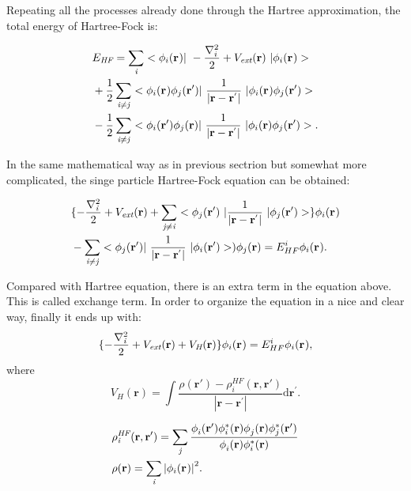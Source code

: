 \documentclass[a4paper, 12pt, titlepage,oneside,drop]{kthesis}
\begin{document}
Repeating all the processes already done through the Hartree approximation, the total energy of Hartree-Fock is:

\begin{equation}\begin{split}
&E_\textit{HF} = \sumi<i> <\bwf<i><> |\ -\frac{\nabla^{2}_{i}}{2} + V_\textit{ext}(\textbf{r})  \ | \bwf<i><> > \\
& + \frac{1}{2} \suminj<i><j> <\bwf<i><> \bwfn<j><'>|\ \frac{1}{|\textbf{r} - \textbf{r}^{'} |} \ | \bwf<i><> \bwfn<j><'>> \\
& - \frac{1}{2} \suminj<i><j> <\bwfn<i><'> \bwfn<j><>|\ \frac{1}{|\textbf{r} - \textbf{r}^{'} |} \ | \bwfn<i><> \bwfn<j><'>>.
\end{split}\end{equation}

In the same mathematical way as in previous sectrion but somewhat more complicated, the singe particle Hartree-Fock equation can be obtained:

\begin{equation}\begin{split}
& \{ -\frac{\nabla^{2}_{\textit i}}{2} + V_\textit{ext}(\textbf{r})+ \suminj<j><i> <\bwfn<j><'>\ | \frac{1}{|\textbf{r} - \textbf{r}^{'} |} \ | \bwfn<j><'>> \} \bwf<i><>  \\
& - \suminj<i><j>  < \bwfn<j><'>|\ \frac{1}{|\textbf{r} - \textbf{r}^{'} |} \ | \bwfn<i><'> >) \bwfn<j><>  = E^{i}_{HF} \bwf<i><>.
\end{split}\end{equation}

Compared with Hartree equation, there is an extra term in the equation above. This is called exchange term. In order to organize the equation in a nice and clear way, finally it ends up with:
\begin{equation}\label{aaaaa}\begin{split}
\{ -\frac{\nabla^{2}_{\textit i}}{2} + V_\textit{ext}(\textbf{r}) +V_\textit{H}(\textbf{r}) \}  \bwf<i><>  = E^{i}_{HF}   \bwf<i><>, 
\end{split}\end{equation}
where
\begin{equation}
 V_\textit{H}(\textbf{r})= \int \frac{\rho(\textbf{r}{'}) - \rho_{\textit{i}}^{\textit{HF}}(\textbf{r},\textbf{r}{'})}{|\textbf{r} - \textbf{r}^{'} |}  \mathrm{d}\textbf{r}^{'}.
\end{equation}

\begin{equation}
\begin{split}
& \rho_{\textit{i}}^{\textit{HF}}(\textbf{r},\textbf{r}{'}) = \sumi<j> \frac{\phi_{i}^{}(\textbf{r}{'}) \phi_{i}^{*}(\textbf{r}{}) \phi_{j}^{}(\textbf{r}{}) \phi_{j}^{*}(\textbf{r}{'})} {\phi_{i}^{}(\textbf{r}) \phi_{i}^{*}(\textbf{r})}  \\
& \rho(\textbf{r}) = \sumi<i>  {|\bwf<i><>|}^{2}.
\end{split}
\end{equation}
\end{document}
